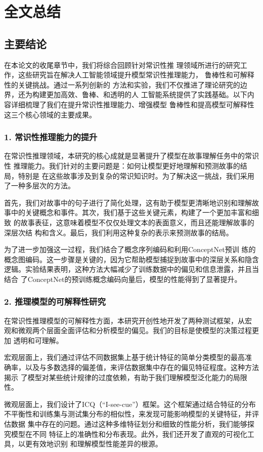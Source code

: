 \section{全文总结}
\subsection{主要结论}
在本论文的收尾章节中，我们将综合回顾针对常识性推
理领域所进行的研究工作，这些研究旨在解决人工智能领域提升模型常识性推理能力，
鲁棒性和可解释性的关键挑战。通过一系列创新的
方法和实验，我们不仅推进了理论研究的边界，还为构建更加高效、鲁棒、和透明的人
工智能系统提供了实践基础。以下内容详细梳理了我们在提升常识性推理能力、增强模型
鲁棒性和提高模型可解释性这三个核心领域的主要成果。

\subsubsection*{1. 常识性推理能力的提升}
在常识性推理领域，本研究的核心成就是显著提升了模型在故事理解任务中的常识性
推理能力。我们针对的主要问题是：如何让模型更好地理解和预测故事的结局，特别是
在这些故事涉及到复杂的常识知识时。为了解决这一挑战，我们采用了一种多层次的方法。

首先，我们对故事中的句子进行了简化处理，这有助于模型更清晰地识别和理解故
事中的关键概念和事件。其次，我们基于这些关键元素，构建了一个更加丰富和细致
的故事表征，这意味着模型不仅仅处理文本的表面意义，而且还能理解故事的深层次结
构和含义。最后，我们利用这种复杂的表示来预测故事的结局。

为了进一步加强这一过程，我们结合了概念序列编码和利用ConceptNet预训
练的概念图编码。这一步骤是关键的，因为它帮助模型捕捉到故事中的深层关系和隐含
逻辑。实验结果表明，这种方法大幅减少了训练数据中的偏见和信息泄露，并且当结合
了ConceptNet的预训练概念编码向量后，模型的性能得到了显著提升。

\subsubsection*{2. 推理模型的可解释性研究}
在常识性推理模型的可解释性方面，本研究开创性地开发了两种测试框架，从宏
观和微观两个层面全面评估和分析模型的偏见。我们的目标是使模型的决策过程更加
透明和可理解。

宏观层面上，我们通过评估不同数据集上基于统计特征的简单分类模型的最高准
确率，以及与多数选择的偏差值，来评估数据集中存在的偏见特征程度。这种方法揭示
了模型对某些统计规律的过度依赖，有助于我们理解模型泛化能力的局限性。

微观层面上，我们设计了ICQ（``I-see-cue''）框架。这个框架通过结合特征的分布
不平衡性和训练集与测试集分布的相似性，来发现可能影响模型的关键特征，并评估数据
集中存在的问题。通过这种多维特征划分和细致的性能分析，我们能够探究模型在不同
特征上的准确性和分布表现。此外，我们还开发了直观的可视化工具，以更有效地识别
和理解模型性能差异的根源。

